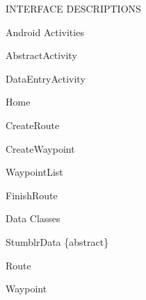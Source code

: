 \documentclass{article}
\begin{document}
	\begin{section}{INTERFACE DESCRIPTIONS}
		\begin{subsection}{Android Activities}
			\begin{subsubsection}{AbstractActivity}
				
			\end{subsubsection}
		
			\clearpage
			\begin{subsubsection}{DataEntryActivity}
				
			\end{subsubsection}
		
			\begin{subsubsection}{Home}
				
			\end{subsubsection}
		
			\clearpage
			\begin{subsubsection}{CreateRoute}
				
			\end{subsubsection}
		
			\clearpage
			\begin{subsubsection}{CreateWaypoint}
				
			\end{subsubsection}
		
			\clearpage
			\begin{subsubsection}{WaypointList}
				
			\end{subsubsection}
		
			\clearpage
			\begin{subsubsection}{FinishRoute}
				
			\end{subsubsection}
		\end{subsection}
		
		\clearpage
		\begin{subsection}{Data Classes}
			\begin{subsubsection}{StumblrData \{abstract\}}
				
			\end{subsubsection}
		
			\clearpage
			\begin{subsubsection}{Route}
				
			\end{subsubsection}
		
			\clearpage
			\begin{subsubsection}{Waypoint}
				
			\end{subsubsection}
		\end{subsection}
	\end{section}
\end{document}
